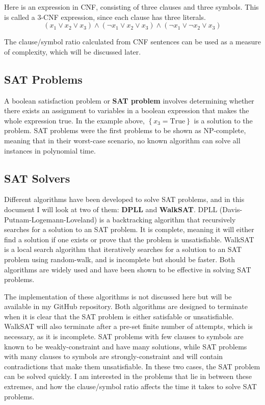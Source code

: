 \documentclass{article}
\begin{document}
    Here is an expression in CNF, consisting of three clauses and three symbols. This is called a 3-CNF expression, since each clause has three literals.
    \begin{equation*}
        (x_1 \lor x_2 \lor x_3) \land (\neg x_1 \lor x_2 \lor x_3) \land (\neg x_1 \lor \neg x_2 \lor x_3)
    \end{equation*}

    The clause/symbol ratio calculated from CNF sentences can be used as a measure of complexity, which will be discussed later.

    \subsection{SAT Problems}

    A boolean satisfaction problem or \textbf{SAT problem} involves determining whether there exists an assignment to variables in a boolean expression that makes the whole expression true.\supercite{sat-np-complete-cook} In the example above, $\left\{x_3 = \text{True}\right\}$ is a solution to the problem. SAT problems were the first problems to be shown as NP-complete, meaning that in their worst-case scenario, no known algorithm can solve all instances in polynomial time.\supercite{britannica-np-complete}

    \subsection{SAT Solvers}
    Different algorithms have been developed to solve SAT problems, and in this document I will look at two of them: \textbf{DPLL} and \textbf{WalkSAT}. DPLL (Davis-Putnam-Logemann-Loveland) is a backtracking algorithm that recursively searches for a solution to an SAT problem. It is complete, meaning it will either find a solution if one exists or prove that the problem is unsatisfiable. WalkSAT is a local search algorithm that iteratively searches for a solution to an SAT problem using random-walk, and is incomplete but should be faster. Both algorithms are widely used and have been shown to be effective in solving SAT problems.\supercite{dpll-algorithm}\supercite{selman1994noise}

    The implementation of these algorithms is not discussed here but will be available in my GitHub repository. Both algorithms are designed to terminate when it is clear that the SAT problem is either satisfable or unsatisfiable. WalkSAT will also terminate after a pre-set finite number of attempts, which is necessary, as it is incomplete. SAT problems with few clauses to symbols are known to be weakly-constraint and have many solutions, while SAT problems with many clauses to symbols are strongly-constraint and will contain contradictions that make them unsatisfiable.\supercite{Norvig_2021} In these two cases, the SAT problem can be solved quickly. I am interested in the problems that lie in between these extremes, and how the clause/symbol ratio affects the time it takes to solve SAT problems.
\end{document}
